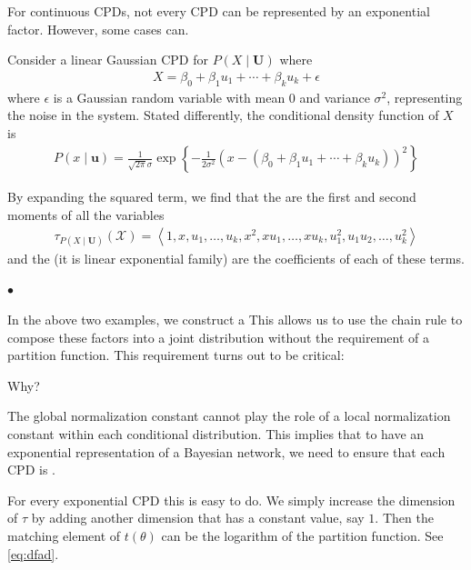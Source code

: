\documentclass{article}
\begin{document}
For continuous CPDs, not every CPD can be represented by an exponential factor. However, some cases can.
\begin{exma}
Consider a linear Gaussian CPD for $P(X \mid \boldsymbol{U})$ where
\begin{align*}
X=\beta_{0}+\beta_{1} u_{1}+\cdots+\beta_{k} u_{k}+\epsilon
\end{align*}
where $\epsilon$ is a Gaussian random variable with mean 0 and variance $\sigma^{2}$, representing the noise in the system. Stated differently, the conditional density function of $X$ is
\begin{align*}
P(x \mid \boldsymbol{u})=\frac{1}{\sqrt{2 \pi} \sigma} \exp \left\{-\frac{1}{2 \sigma^{2}}\left(x-\left(\beta_{0}+\beta_{1} u_{1}+\cdots+\beta_{k} u_{k}\right)\right)^{2}\right\}
\end{align*}

By expanding the squared term, we find that the  are the first and second moments of all the variables
\begin{align}
\tau_{P(X \mid \boldsymbol{U})}(\mathcal{X})=\left\langle 1, x, u_{1}, \ldots, u_{k}, x^{2}, x u_{1}, \ldots, x u_{k}, u_{1}^{2}, u_{1} u_{2}, \ldots, u_{k}^{2}\right\rangle\label{eq:dfad}
\end{align}
and the  (it is linear exponential family) are the coefficients of each of these terms.
\end{exma}

$\bullet$  

In the above two examples, we construct a  This allows us to use the chain rule to compose these factors into a joint distribution without the requirement of a partition function. This requirement turns out to be critical: 

 {Why?}

 {The global normalization constant cannot play the role of a local normalization constant within each conditional distribution. This implies that to have an exponential representation of a Bayesian network, we need to ensure that each CPD is .}
\begin{rema}
For every exponential CPD this is easy to do. We simply increase the dimension of $\tau$ by adding another dimension that has a constant value, say $1 .$ Then the matching element of $t(\theta)$ can be the logarithm of the partition function. See \cref{eq:dfad}.
\end{rema}
\end{document}
